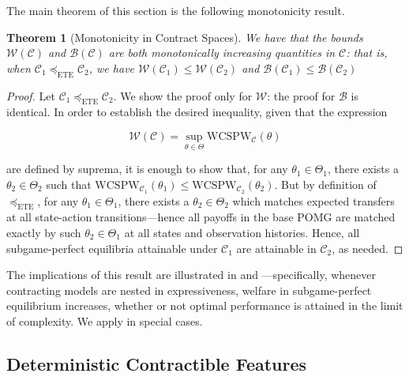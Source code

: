 \documentclass[referee,sn-basic]{sn-jnl}
\theoremstyle{thmstyleone}%
\newtheorem{theorem}{Theorem}%
\theoremstyle{thmstyletwo}%
\theoremstyle{thmstylethree}%
\begin{document}
The main theorem of this section is the following monotonicity result.
\begin{theorem}[Monotonicity in Contract Spaces]\label{thm:monotonicity}
    We have that the bounds $\mathcal{W}(\mathcal{C})$ and $\mathcal{B}(\mathcal{C})$ are both monotonically increasing quantities in $\mathcal{C}$: that is, when $\mathcal{C}_1 \preceq_{\operatorname{ETE}} \mathcal{C}_2$, we have $\mathcal{W}(\mathcal{C}_1) \le \mathcal{W}(\mathcal{C}_2)$ and $\mathcal{B}(\mathcal{C}_1) \le \mathcal{B}(\mathcal{C}_2)$
\end{theorem}

\begin{proof}
    Let $\mathcal{C}_1 \preceq_{\operatorname{ETE}} \mathcal{C}_2$. We show the proof only for $\mathcal{W}$: the proof for $\mathcal{B}$ is identical. In order to establish the desired inequality, given that the expression
    
    \[
    \mathcal{W}(\mathcal{C}) = \sup_{\theta \in \Theta} \mathrm{WCSPW}_\mathcal{C}(\theta)
    \]

    are defined by suprema, it is enough to show that, for any $\theta_1 \in \Theta_1$, there exists a $\theta_2 \in \Theta_2$ such that $\mathrm{WCSPW}_{\mathcal{C}_1}(\theta_1) \le \mathrm{WCSPW}_{\mathcal{C}_2}(\theta_2)$. But by definition of $\preceq_{\operatorname{ETE}}$, for any $\theta_1 \in \Theta_1$, there exists a $\theta_2 \in \Theta_2$ which matches expected transfers at all state-action transitions---hence all payoffs in the base POMG are matched exactly by such $\theta_2 \in \Theta_1$ at all states and observation histories. Hence, all subgame-perfect equilibria attainable under $\mathcal{C}_1$ are attainable in $\mathcal{C}_2$, as needed. 
\end{proof}

The implications of this result are illustrated in  and ---specifically, whenever contracting models are nested in expressiveness, welfare in subgame-perfect equilibrium increases, whether or not optimal performance is attained in the limit of complexity. We apply  in special cases.

\subsection{Deterministic Contractible Features}
\end{document}
